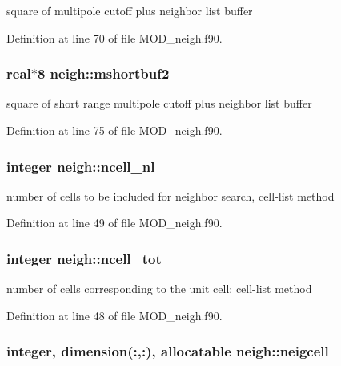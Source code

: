 square of multipole cutoff plus neighbor list buffer 



Definition at line 70 of file M\-O\-D\-\_\-neigh.\-f90.

\hypertarget{classneigh_a8dca5facfaf57e4868e61d23956eafed}{
\subsubsection[{mshortbuf2}]{\setlength{\rightskip}{0pt plus 5cm}real$\ast$8 neigh\-::mshortbuf2}}\label{classneigh_a8dca5facfaf57e4868e61d23956eafed}


square of short range multipole cutoff plus neighbor list buffer 



Definition at line 75 of file M\-O\-D\-\_\-neigh.\-f90.

\hypertarget{classneigh_a26e26aed27268acd9f2dc587f89a4bcc}{
\subsubsection[{ncell\-\_\-nl}]{\setlength{\rightskip}{0pt plus 5cm}integer neigh\-::ncell\-\_\-nl}}\label{classneigh_a26e26aed27268acd9f2dc587f89a4bcc}


number of cells to be included for neighbor search, cell-\/list method 



Definition at line 49 of file M\-O\-D\-\_\-neigh.\-f90.

\hypertarget{classneigh_a207a01b850afbc2b58c02b480cb7018e}{
\subsubsection[{ncell\-\_\-tot}]{\setlength{\rightskip}{0pt plus 5cm}integer neigh\-::ncell\-\_\-tot}}\label{classneigh_a207a01b850afbc2b58c02b480cb7018e}


number of cells corresponding to the unit cell\-: cell-\/list method 



Definition at line 48 of file M\-O\-D\-\_\-neigh.\-f90.

\hypertarget{classneigh_ae3aefdb55a54810d0a4c7d9001957752}{
\subsubsection[{neigcell}]{\setlength{\rightskip}{0pt plus 5cm}integer, dimension(\-:,\-:), allocatable neigh\-::neigcell}}\label{classneigh_ae3aefdb55a54810d0a4c7d9001957752}


